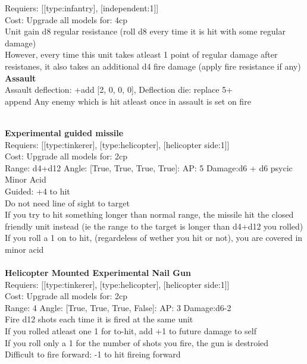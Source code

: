 Requiers: [[type:infantry], [independent:1]] \\
Cost: Upgrade all models for: 4cp \\
Unit gain d8 regular resistance (roll d8 every time it is hit with some regular damage)\\ 
However, every time this unit takes atleast 1 point of regular damage after resistanes, it also takes an additional d4 fire damage (apply fire resistance if any)\\ 




{\bf Assault} \ \\
Assault deflection: +add [2, 0, 0, 0], Deflection die: replace 5+
\\ 

append Any enemy which is hit atleast once in assault is set on fire


\ \\
{\bf Experimental guided missile } \\

Requiers: [[type:tinkerer], [type:helicopter], [helicopter side:1]] \\
Cost: Upgrade all models for: 2cp \\


Range: d4+d12  Angle: [True, True, True, True]: AP: 5 Damage:d6 + d6 psycic \\
Minor Acid\\ 
Guided: +4 to hit\\ 
Do not need line of sight to target\\ 
If you try to hit something longer than normal range, the missile hit the closed friendly unit instead (ie the range to the target is longer than d4+d12 you rolled)\\ 
If you roll a 1 on to hit, (regardeless of wether you hit or not), you are covered in minor acid\\ 








\ \\
{\bf Helicopter Mounted Experimental Nail Gun } \\

Requiers: [[type:tinkerer], [type:helicopter], [helicopter side:1]] \\
Cost: Upgrade all models for: 2cp \\


Range: 4  Angle: [True, True, True, False]: AP: 3 Damage:d6-2 \\
Fire d12 shots each time it is fired at the same unit\\ 
If you rolled atleast one 1 for to-hit, add +1 to future damage to self\\ 
If you roll only a 1 for the number of shots you fire, the gun is destroied\\ 
Difficult to fire forward: -1 to hit fireing forward\\ 








